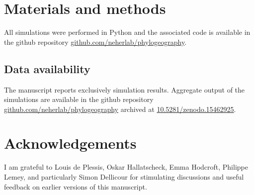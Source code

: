 \documentclass[aps,rmp, twocolumn]{revtex4}
\begin{document}
\section*{Materials and methods}
All simulations were performed in Python and the associated code is available in the github repository \href{https://github.com/neherlab/phylogeography}{github.com/neherlab/phylogeography}.
\subsection*{Data availability}
The manuscript reports exclusively simulation results. Aggregate output of the simulations are available in the github repository \href{https://github.com/neherlab/phylogeography}{github.com/neherlab/phylogeography} archived at \href{https://doi.org/10.5281/zenodo.15462925}{10.5281/zenodo.15462925}.


\section*{Acknowledgements}
I am grateful to Louis de Plessis, Oskar Hallatscheck, Emma Hodcroft, Philippe Lemey, and particularly Simon Dellicour for stimulating discussions and useful feedback on earlier versions of this manuscript.
\end{document}
